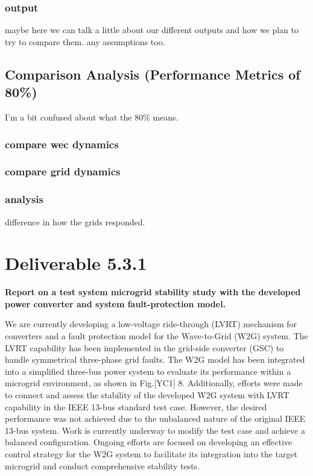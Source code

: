 \documentclass[conference]{IEEEtran}
\begin{document}
    \subsubsection*{output}
        maybe here we can talk a little about our different outputs and how we plan to try to compare them. any assumptions too. 
    
\subsection*{Comparison Analysis (Performance Metrics of 80\%)}
    I'm a bit confused about what the 80\% means. 
    
    \subsubsection*{compare wec dynamics}

    \subsubsection*{compare grid dynamics}

    \subsubsection*{analysis}
        difference in how the grids responded.





\section{Deliverable 5.3.1}

\textbf{Report on a test system microgrid stability study with the developed power converter and system fault-protection model.}

We are currently developing a low-voltage ride-through (LVRT) mechanism for converters and a fault protection model for the Wave-to-Grid (W2G) system. The LVRT capability has been implemented in the grid-side converter (GSC) to handle symmetrical three-phase grid faults. The W2G model has been integrated into a simplified three-bus power system to evaluate its performance within a microgrid environment, as shown in Fig.[YC1]  8.
Additionally, efforts were made to connect and assess the stability of the developed W2G system with LVRT capability in the IEEE 13-bus standard test case. However, the desired performance was not achieved due to the unbalanced nature of the original IEEE 13-bus system. Work is currently underway to modify the test case and achieve a balanced configuration.
Ongoing efforts are focused on developing an effective control strategy for the W2G system to facilitate its integration into the target microgrid and conduct comprehensive stability tests.



\vspace{12pt}



\end{document}
